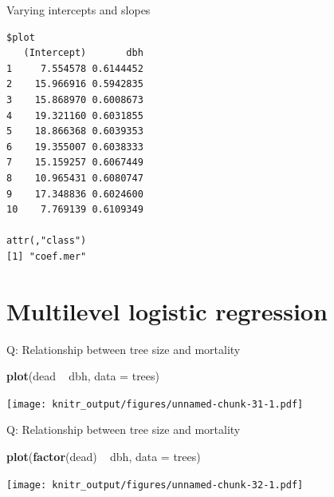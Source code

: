 \documentclass[10pt,ignorenonframetext,]{beamer}
\newenvironment{Shaded}{\begin{snugshade}}{\end{snugshade}}
\newcommand{\KeywordTok}[1]{\textcolor[rgb]{0.13,0.29,0.53}{\textbf{{#1}}}}
\newcommand{\DataTypeTok}[1]{\textcolor[rgb]{0.13,0.29,0.53}{{#1}}}
\newcommand{\StringTok}[1]{\textcolor[rgb]{0.31,0.60,0.02}{{#1}}}
\newcommand{\NormalTok}[1]{{#1}}
\begin{document}
\begin{frame}[fragile]{Varying intercepts and slopes}

\begin{verbatim}
$plot
   (Intercept)       dbh
1     7.554578 0.6144452
2    15.966916 0.5942835
3    15.868970 0.6008673
4    19.321160 0.6031855
5    18.866368 0.6039353
6    19.355007 0.6038333
7    15.159257 0.6067449
8    10.965431 0.6080747
9    17.348836 0.6024600
10    7.769139 0.6109349

attr(,"class")
[1] "coef.mer"
\end{verbatim}

\end{frame}

\section{Multilevel logistic
regression}\label{multilevel-logistic-regression}

\begin{frame}[fragile]{Q: Relationship between tree size and mortality}

\begin{Shaded}
\begin{Highlighting}[]
\KeywordTok{plot}\NormalTok{(dead ~}\StringTok{ }\NormalTok{dbh, }\DataTypeTok{data =} \NormalTok{trees)}
\end{Highlighting}
\end{Shaded}

\texttt{[image: knitr\_output/figures/unnamed-chunk-31-1.pdf]}

\end{frame}

\begin{frame}[fragile]{Q: Relationship between tree size and mortality}

\begin{Shaded}
\begin{Highlighting}[]
\KeywordTok{plot}\NormalTok{(}\KeywordTok{factor}\NormalTok{(dead) ~}\StringTok{ }\NormalTok{dbh, }\DataTypeTok{data =} \NormalTok{trees)}
\end{Highlighting}
\end{Shaded}

\texttt{[image: knitr\_output/figures/unnamed-chunk-32-1.pdf]}

\end{frame}
\end{document}
